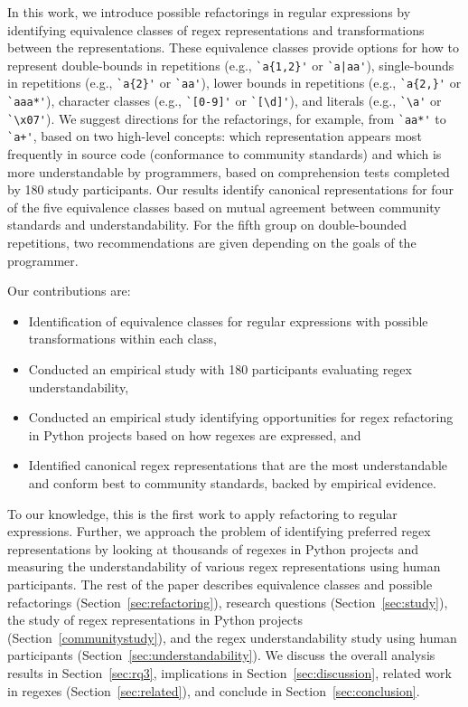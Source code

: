 In this work, we introduce possible refactorings in regular expressions by identifying equivalence classes of regex representations and transformations between the representations.
These equivalence classes provide options for how to represent double-bounds in repetitions (e.g., \verb!`a{1,2}'! or \verb!`a|aa'!), single-bounds in repetitions (e.g., \verb!`a{2}'! or \verb!`aa'!), lower bounds in repetitions (e.g., \verb!`a{2,}'! or \verb!`aaa*'!), character classes (e.g., \verb!`[0-9]'! or \verb!`[\d]'!), and literals (e.g., \verb!`\a'! or \verb!`\x07'!).
We suggest directions for the refactorings, for example, from \verb!`aa*'!  to  \verb!`a+'!, based on two high-level concepts: which representation appears most frequently in source code (conformance to community standards) and which is more understandable by programmers, based on comprehension tests completed by 180 study participants.
Our results identify canonical representations for four of the five equivalence classes based on mutual agreement between community standards and understandability. For the fifth group on double-bounded repetitions, two recommendations are given depending on the goals of the programmer.

Our contributions are:
\begin{itemize}
\item Identification of  equivalence classes for regular expressions with possible transformations within each class,
\item Conducted an empirical study with 180 participants evaluating regex understandability,
\item Conducted an empirical study identifying opportunities for regex refactoring  in Python projects based on how regexes are expressed, and
\item {Identified canonical regex representations that are the most understandable and conform best to community standards, backed by empirical evidence.}
\end{itemize}

To our knowledge, this is the first work to apply refactoring to regular expressions. Further, we approach the problem of identifying preferred regex representations by looking at thousands of regexes in Python projects and measuring the understandability of various regex representations using human participants. The rest of the paper describes
equivalence classes and possible refactorings (Section~\ref{sec:refactoring}), research questions (Section~\ref{sec:study}), the study of regex representations in Python projects (Section~\ref{communitystudy}), and the regex understandability study using human participants (Section~\ref{sec:understandability}). We discuss the overall analysis results in Section~\ref{sec:rq3}, implications in Section~\ref{sec:discussion},  related work in regexes (Section~\ref{sec:related}), and conclude in Section~\ref{sec:conclusion}.

%
